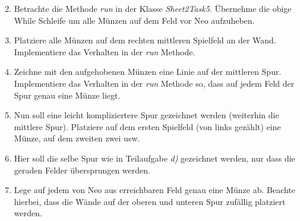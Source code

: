 \begin{enumerate}[label=\alph*)] \setcounter{enumi}{1}
    \item Betrachte die Methode \textit{run} in der Klasse \textit{Sheet2Task5}. Übernehme die obige While Schleife um 
    alle Münzen auf dem Feld vor Neo aufzuheben.
    \item Platziere alle Münzen auf dem rechten mittleren Spielfeld an der Wand. Implementiere das Verhalten in der \textit{run} Methode.
    \item Zeichne mit den aufgehobenen Münzen eine Linie auf der mittleren Spur. Implementiere das Verhalten in der \textit{run} Methode so, dass 
    auf jedem Feld der Spur genau eine Münze liegt.
    \item Nun soll eine leicht kompliziertere Spur gezeichnet werden (weiterhin die mittlere Spur). Platziere auf dem ersten Spielfeld (von links gezählt)
    eine Münze, auf dem zweiten zwei usw.
    \item Hier soll die selbe Spur wie in Teilaufgabe \textit{d)} gezeichnet werden, nur dass die geraden Felder übersprungen werden.
    \item Lege auf jedem von Neo aus erreichbaren Feld genau eine Münze ab. Beachte hierbei, dass die Wände auf der oberen und unteren Spur zufällig platziert 
    werden.
\end{enumerate}